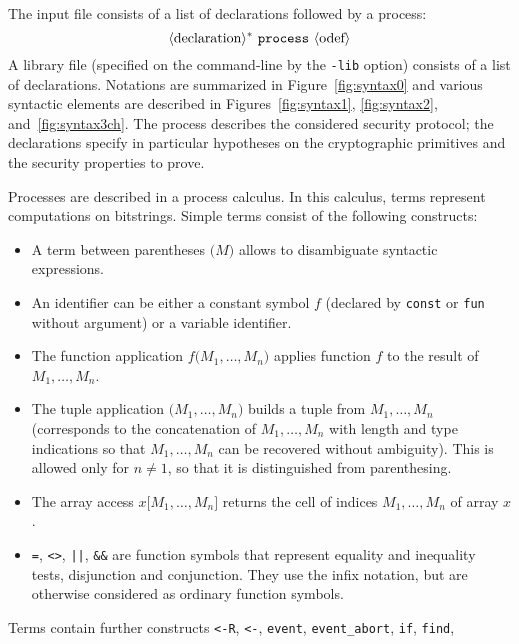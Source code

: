 The input file consists of a list of declarations followed by  
a process:
\[\langle\textrm{declaration}\rangle^*\ {\tt process}\ \langle\textrm{odef}\rangle\]
A library file (specified on the command-line by the
{\tt -lib} option) consists of a list of declarations.
Notations are summarized in Figure~\ref{fig:syntax0}
and various syntactic elements are described in 
Figures~\ref{fig:syntax1}, \ref{fig:syntax2}, and~\ref{fig:syntax3ch}.
The process
describes the considered security 
protocol; the declarations specify in particular hypotheses on the 
cryptographic primitives and the security properties to prove.

Processes are described in a process calculus.
In this calculus, terms represent computations on bitstrings. 
Simple terms consist
of the following constructs:
\begin{itemize}

\item A term between parentheses $\texttt{(}M\texttt{)}$
allows to disambiguate syntactic expressions.

\item An identifier can be either a constant symbol $f$
(declared by \texttt{const} or \texttt{fun} without argument)
or a variable identifier.

\item The function application $f\texttt{(}M_1, \ldots, M_n\texttt{)}$
applies function $f$ to the result of $M_1, \ldots, M_n$.

\item The tuple application $\texttt{(}M_1, \ldots, M_n\texttt{)}$
builds a tuple from $M_1, \ldots, M_n$ (corresponds to the concatenation
of $M_1, \ldots, M_n$ with length and type indications so that 
$M_1, \ldots, M_n$ can be recovered without ambiguity).
This is allowed only for $n \neq 1$, so that it is distinguished
from parenthesing.

\item The array access $x\texttt{[}M_1, \ldots, M_n\texttt{]}$
returns the cell of indices $M_1, \ldots, M_n$ of array $x$.

\item \texttt{=}, \texttt{<>}, \texttt{||}, \texttt{\&\&}
are function symbols that represent equality and inequality tests, 
disjunction and conjunction. They use the infix notation, but
are otherwise considered as ordinary function symbols.

\end{itemize}
Terms contain further constructs \texttt{<-R}, \texttt{<-}, \texttt{event}, \texttt{event\string_abort}, \texttt{if}, \texttt{find},
